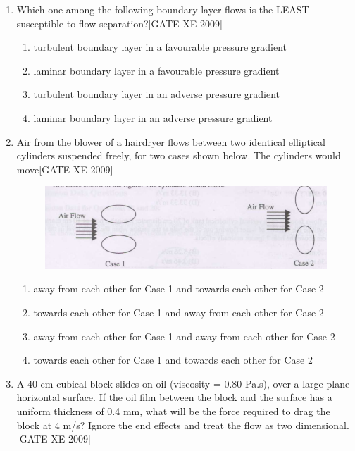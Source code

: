 \documentclass[journal,12pt,onecolumn]{IEEEtran}
\theoremstyle{remark}
\begin{document}
\begin{enumerate}
\item Which one among the following boundary layer flows is the LEAST susceptible to flow separation?\hfill[GATE XE 2009]
\begin{enumerate}
    \item turbulent boundary layer in a favourable pressure gradient
    \item laminar boundary layer in a favourable pressure gradient
    \item turbulent boundary layer in an adverse pressure gradient
    \item laminar boundary layer in an adverse pressure gradient
\end{enumerate}

\item Air from the blower of a hairdryer flows between two identical elliptical cylinders suspended freely, for two cases shown below. The cylinders would move\hfill[GATE XE 2009]

\begin{figure}[h]
\includegraphics[width=0.5\columnwidth]{figs/fig1.png}
\centering
\end{figure}
\begin{enumerate}
    \item away from each other for Case 1 and towards each other for Case 2
    \item towards each other for Case 1 and away from each other for Case 2
    \item away from each other for Case 1 and away from each other for Case 2
    \item towards each other for Case 1 and towards each other for Case 2
\end{enumerate}    




\item A 40 cm cubical block slides on oil (viscosity = 0.80 Pa.s), over a large plane horizontal surface. If the oil film between the block and the surface has a uniform thickness of 0.4 mm, what will be the force required to drag the block at 4 m/s? Ignore the end effects and treat the flow as two dimensional.\hfill[GATE XE 2009]\\
\begin{enumerate}
\end{enumerate}




\end{enumerate}
\end{document}
